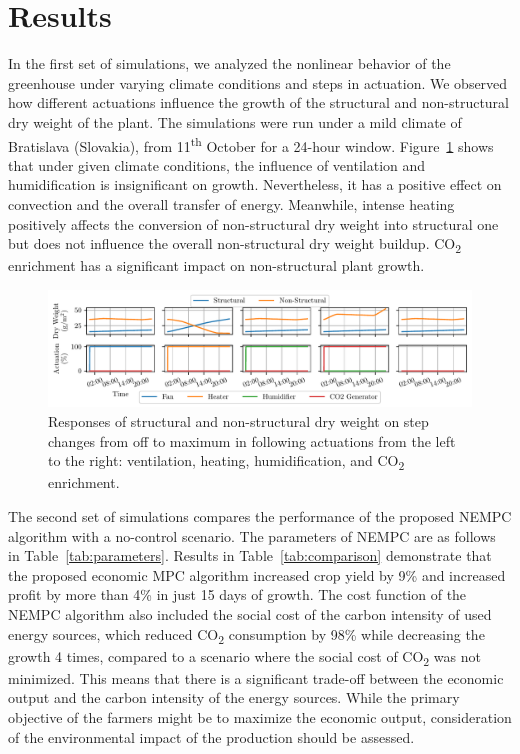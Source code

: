 \documentclass[conference]{IEEEtran}
\begin{document}
\section{Results}
In the first set of simulations, we analyzed the nonlinear behavior of the greenhouse under varying climate conditions and steps in actuation. We observed how different actuations influence the growth of the structural and non-structural dry weight of the plant. The simulations were run under a mild climate of Bratislava (Slovakia), from 11\textsuperscript{th} October for a 24-hour window. Figure~\ref{fig:steps} shows that under given climate conditions, 
the influence of ventilation and humidification is insignificant on growth.
Nevertheless, it has a positive effect on convection and the overall transfer of energy. Meanwhile, intense heating positively affects the conversion of non-structural dry weight into structural one but does not influence the overall non-structural dry weight buildup. CO\textsubscript{2} enrichment has a significant impact on non-structural plant growth.

\begin{figure}
    \centering
    \includegraphics[width=\textwidth]{figures/step_response-outputs-2024-10-11_2024-10-26-120s.pdf}
    \caption{Responses of structural and non-structural dry weight on step changes from off to maximum in following actuations from the left to the right: ventilation, heating, humidification, and CO\textsubscript{2} enrichment.}\label{fig:steps}
\end{figure}


The second set of simulations compares the performance of the proposed NEMPC algorithm with a no-control scenario. The parameters of NEMPC are as follows in Table~\ref{tab:parameters}. Results in Table~\ref{tab:comparison} demonstrate that the proposed economic MPC algorithm increased crop yield by 9\% and increased profit by more than 4\% in just 15 days of growth. The cost function of the NEMPC algorithm also included the social cost of the carbon intensity of used energy sources, which reduced CO\textsubscript{2} consumption by 98\% while decreasing the growth 4 times, compared to a scenario where the social cost of CO\textsubscript{2} was not minimized. This means that there is a significant trade-off between the economic output and the carbon intensity of the energy sources. While the primary objective of the farmers might be to maximize the economic output, consideration of the environmental impact of the production should be assessed.
\end{document}
